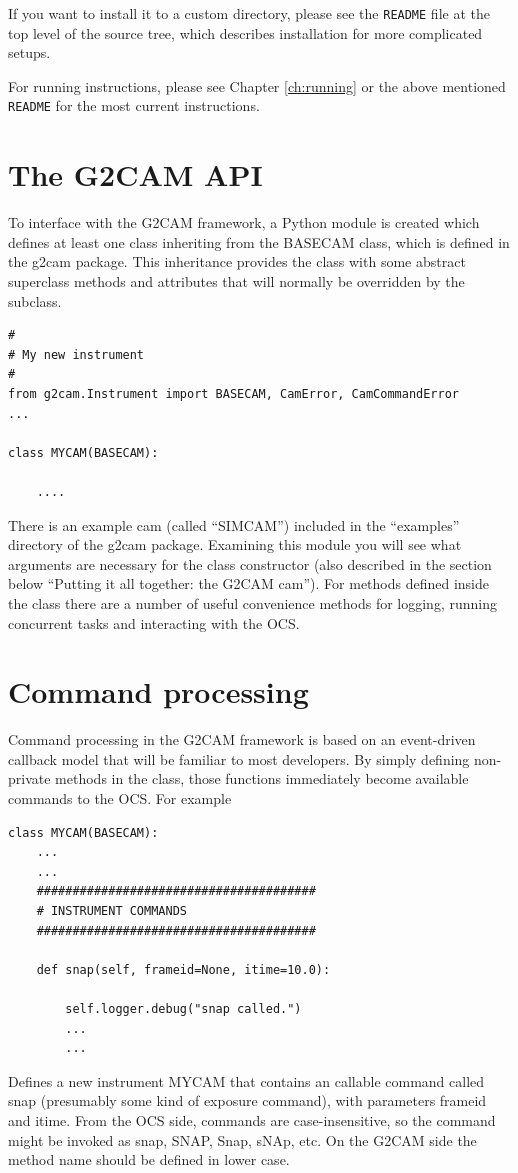 \documentclass[11pt]{report}
\begin{document}
If you want to install it to a custom directory, please see the
{\tt README} file at the top level of the source tree, which describes
installation for more complicated setups.

For running instructions, please see Chapter \ref{ch:running} or the
above mentioned {\tt README} for the most current instructions.  

\section{The G2CAM API}
To interface with the G2CAM framework, a Python module is created which
defines at least one class inheriting from the BASECAM class, which is
defined in the g2cam package.
This inheritance provides the class with some abstract superclass
methods and attributes that will normally be overridden by the subclass. 

\begin{verbatim}
#
# My new instrument
#
from g2cam.Instrument import BASECAM, CamError, CamCommandError
...

class MYCAM(BASECAM):

    ....

\end{verbatim}
There is an example cam (called ``SIMCAM'') included in the ``examples''
directory of the g2cam package. Examining this module you will see what
arguments are necessary for the class constructor (also described in the
section below ``Putting it all together: the G2CAM cam'').
For methods defined inside the class there are a number of useful
convenience methods for logging, running concurrent tasks and
interacting with the OCS. 

\section{Command processing}
Command processing in the G2CAM framework is based on an event-driven
callback model that will be familiar to most developers. By simply
defining non-private methods in the class, those functions immediately
become available commands to the OCS. For example 
\begin{verbatim}
class MYCAM(BASECAM):
    ...
    ...
    #######################################
    # INSTRUMENT COMMANDS
    #######################################

    def snap(self, frameid=None, itime=10.0):

        self.logger.debug("snap called.")
        ...
        ...

\end{verbatim}
Defines a new instrument MYCAM that contains an callable command called
snap (presumably some kind of exposure command), with parameters frameid
and itime. From the OCS side, commands are case-insensitive, so the
command might be invoked as snap, SNAP, Snap, sNAp, etc. 
On the G2CAM side the method name should be defined in lower case. 
\end{document}
